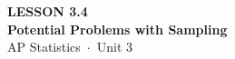 \documentclass[aspectratio=169, 11pt]{beamer}
\begin{document}
{
\begin{frame}[plain]
  \vspace{2.8cm}\hspace{0.55cm}%
  \begin{minipage}{0.9\textwidth}
    {\color{goldacc}\bfseries\small LESSON 3.4}\\[0.5cm]
    {\color{white}\bfseries\LARGE Potential Problems with Sampling}\\[1.2cm]
    {\color{skymid}\small AP Statistics~$\cdot$~Unit 3}
  \end{minipage}
\end{frame}
}

\begin{frame}[t, plain]
\end{frame}
\end{document}
